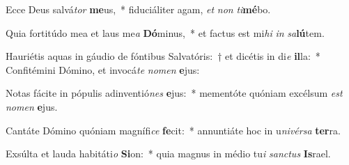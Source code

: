 \item Ecce Deus salvá\textit{tor} \textbf{me}us,~* fiduciáliter agam, \textit{et} \textit{non} \textit{ti}\textbf{mé}bo.
\item Quia fortitúdo mea et laus me\textit{a} \textbf{Dó}minus,~* et factus est mi\textit{hi} \textit{in} \textit{sa}\textbf{lú}tem.
\item Hauriétis aquas in gáudio de fóntibus Salvatóris:~† et dicétis in di\textit{e} \textbf{il}la:~* Confitémini Dómino, et invocá\textit{te} \textit{no}\textit{men} \textbf{e}jus:
\item Notas fácite in pópulis adinventió\textit{nes} \textbf{e}jus:~* mementóte quóniam excélsum \textit{est} \textit{no}\textit{men} \textbf{e}jus.
\item Cantáte Dómino quóniam magnífi\textit{ce} \textbf{fe}cit:~* annuntiáte hoc in u\textit{ni}\textit{vér}\textit{sa} \textbf{ter}ra.
\item Exsúlta et lauda habitáti\textit{o} \textbf{Si}on:~* quia magnus in médio tu\textit{i} \textit{sanc}\textit{tus} \textbf{Is}rael.
